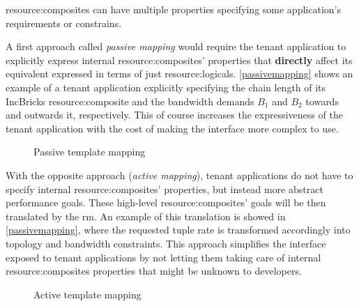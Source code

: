 \Glspl{resource:composite} can have multiple properties specifying some application's requirements or constrains.

A first approach called \textit{passive mapping} would require the tenant application to explicitly express internal \glspl{resource:composite}' properties that \textbf{directly} affect its equivalent expressed in terms of just \glspl{resource:logical}.
\autoref{passivemapping} shows an example of a tenant application explicitly specifying the chain length of its IncBricks \cite{incbricks} \gls{resource:composite} and the bandwidth demands $B_1$ and $B_2$ towards and outwards it, respectively.
This of course increases the expressiveness of the tenant application with the cost of making the interface more complex to use.

\begin{figure}[!htb]
    \centering
    \usebox{\passivemapping}
    \caption{Passive template mapping}
    \label{passivemapping}
\end{figure}

With the opposite approach (\textit{active mapping}), tenant applications do not have to specify internal \glspl{resource:composite}' properties, but instead more abstract performance goals.
These high-level \glspl{resource:composite}' goals will be then translated by the \gls{rm}.
An example of this translation is showed in \autoref{passivemapping}, where the requested tuple rate is transformed accordingly into topology and bandwidth constraints.
This approach simplifies the interface exposed to tenant applications by not letting them taking care of internal \glspl{resource:composite} properties that might be unknown to developers.

\begin{figure}[!htb]
    \centering
    \usebox{\activemapping}
    \caption{Active template mapping}
    \label{activemapping}
\end{figure}
